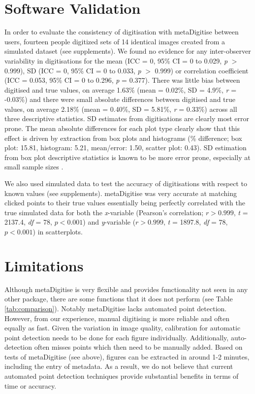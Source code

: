 \documentclass[12pt]{article}
\newcommand{\pkg}[1]{{\fontseries{b}\selectfont #1}}
\begin{document}
\section{Software Validation}
In order to evaluate the consistency of digitisation with \pkg{metaDigitise} between users, fourteen people digitized sets of 14 identical images created from a simulated dataset (see supplements). We found no evidence for any inter-observer variability in digitisations for the mean (ICC = 0, 95\% CI = 0 to 0.029, \textit{p} $>$ 0.999), SD (ICC = 0, 95\% CI = 0 to 0.033, \textit{p} $>$ 0.999) or correlation coefficient (ICC = 0.053, 95\% CI = 0 to 0.296, \textit{p} = 0.377). There was little bias between digitised and true values, on average 1.63\% (mean = 0.02\%, SD = 4.9\%, \textit{r} = -0.03\%) and there were small absolute differences between digitised and true values, on average 2.18\% (mean = 0.40\%, SD = 5.81\%, \textit{r} = 0.33\%) across all three descriptive statistics. SD estimates from digitisations are clearly most error prone. The mean absolute differences for each plot type clearly show that this effect is driven by extraction from box plots and histograms (\% difference; box plot: 15.81, histogram: 5.21, mean/error: 1.50, scatter plot: 0.43). SD estimation from box plot descriptive statistics is known to be more error prone, especially at small sample sizes \citep{Wan2014}. 

We also used simulated data to test the accuracy of digitisations with respect to known values (see supplements). \pkg{metaDigitise} was very accurate at matching clicked points to their true values essentially being perfectly correlated with the true simulated data for both the \textit{x}-variable (Pearson's correlation; $r > 0.999$, \textit{t} = 2137.4, \textit{df} = 78, $p < 0.001$) and \textit{y}-variable ($r > 0.999$, \textit{t} = 1897.8, \textit{df} = 78, $p < 0.001$) in scatterplots.






\section{Limitations}

Although \pkg{metaDigitise} is very flexible and provides functionality not seen in any other package, there are some functions that it does not perform (see Table \ref{tab:comparison}). Notably \pkg{metaDigitise} lacks automated point detection. However, from our experience, manual digitising is more reliable and often equally as fast. Given the variation in image quality, calibration for automatic point detection needs to be done for each figure individually. Additionally, auto-detection often misses points which then need to be manually added. Based on tests of \pkg{metaDigitise} (see above), figures can be extracted in around 1-2 minutes, including the entry of metadata. As a result, we do not believe that current automated point detection techniques provide substantial benefits in terms of time or accuracy.
\end{document}
